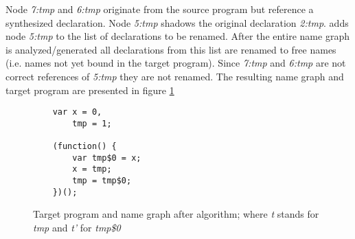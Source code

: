 Node \textit{7:tmp} and \textit{6:tmp} originate from the source program but reference a synthesized declaration. Node \textit{5:tmp} shadows the original declaration \textit{2:tmp}. \textit{\vfix} adds node \textit{5:tmp} to the list of declarations to be renamed. After the entire name graph is analyzed/generated all declarations from this list are renamed to free names (i.e. names not yet bound in the target program). Since \textit{7:tmp} and \textit{6:tmp} are not correct references of \textit{5:tmp} they are not renamed. The resulting name graph and target program are presented in figure \ref{fig:name-graph-fixed}

\begin{figure}[h]
\centering
\begin{minipage}{0.25\linewidth}
\begin{lstlisting}
	var x = 0,
		tmp = 1;

	(function() {
		var tmp$0 = x;
		x = tmp;
		tmp = tmp$0;
	})();
\end{lstlisting}
\end{minipage}
\hfill
\begin{minipage}{0.65\linewidth}
\end{minipage}

\caption{Target program and name graph after \textit{\vfix} algorithm; where \textit{t} stands for \textit{tmp} and \textit{t'} for \textit{tmp\$0}} \label{fig:name-graph-fixed}
\end{figure}

